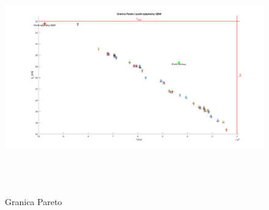 \documentclass{article}
\begin{document}
\pagebreak
\begin{landscape}
    \begin{figure}[h]
        \vspace*{-2cm}
        \includegraphics[width=20cm,height=10cm]{graphics/pareto.png}
        \centering
        \caption{Granica Pareto}
    \end{figure}
\end{landscape}
\end{document}
